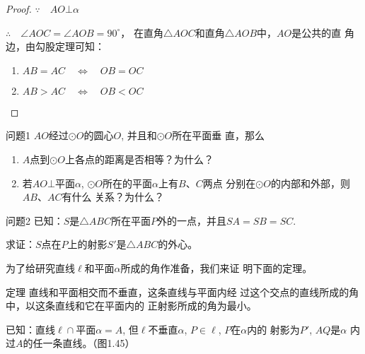 \begin{figure}[htp]
  \centering
{}
  \caption{}
\end{figure}


\begin{proof}
$\because\quad AO\bot\alpha$

$\therefore \quad \angle AOC=\angle AOB=90^{\circ}$，
在直角$\triangle AOC$和直角$\triangle AOB$中，$AO$是公共的直
角边，由勾股定理可知：
\begin{enumerate}
  \item $AB=AC\quad \Longleftrightarrow \quad OB=OC$
  \item $AB>AC\quad \Longleftrightarrow \quad OB<OC$
\end{enumerate}
\end{proof}

\begin{blk}
  {问题1} $AO$经过$\odot O$的圆心$O$, 并且和$\odot O$所在平面垂
直，那么
\begin{enumerate}
  \item $A$点到$\odot O$上各点的距离是否相等？为什么？
  \item 若$AO\bot$平面$\alpha$, $\odot O$所在的平面$\alpha$上有$B$、$C$两点
分别在$\odot O$的内部和外部，则$AB$、$AC$有什么
关系？为什么？
\end{enumerate}
\end{blk}


\begin{blk}
  {问题2} 已知：$S$是$\triangle ABC$所在平面$P$外的一点，并且$SA
=SB=SC$.

求证：$S$点在$P$上的射影$S'$是$\triangle ABC$的外心。
\end{blk}

为了给研究直线$\ell$和平面$\alpha$所成的角作准备，我们来证
明下面的定理。

\begin{blk}
  {定理} 直线和平面相交而不垂直，这条直线与平面内经
过这个交点的直线所成的角中，以这条直线和它在平面内的
正射影所成的角为最小。
\end{blk}

已知：直线$\ell\cap$平面$\alpha=A$, 但$\ell$不垂直$\alpha$, $P\in\ell$, $P$在$\alpha$内的
射影为$P'$, $AQ$是$\alpha$
内过$A$的任一条直线。（图1.45）


